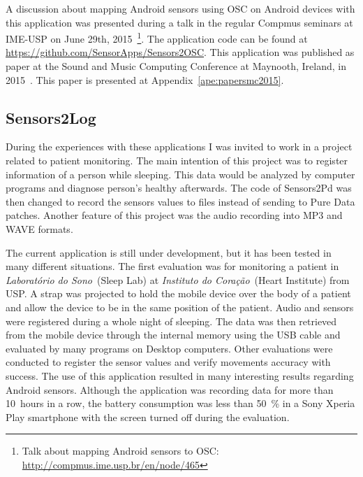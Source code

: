 A discussion about mapping Android sensors using OSC on Android devices with this application was presented during a talk in the regular Compmus seminars at IME-USP on June 29th, 2015~\footnote{Talk about mapping Android sensors to OSC: \url{http://compmus.ime.usp.br/en/node/465}}.
The application code can be found at \url{https://github.com/SensorApps/Sensors2OSC}.
This application was published as paper at the Sound and Music Computing Conference at Maynooth, Ireland, in 2015~\citep{deCarvalhoJunior2015sensors2osc}.
This paper is presented at Appendix~\ref{ape:papersmc2015}.

\subsection*{Sensors2Log}
\label{subsec:appsensors2log}

During the experiences with these applications I was invited to work in a project related to patient monitoring. %
The main intention of this project was to register information of a person while sleeping.
This data would be analyzed by computer programs and diagnose person's healthy afterwards.
The code of Sensors2Pd was then changed to record the sensors values to files instead of sending to Pure Data patches.
Another feature of this project was the audio recording into MP3 and WAVE formats.

The current application is still under development, but it has been tested in many different situations.
The first evaluation was for monitoring a patient in \textit{Laboratório do Sono}~(Sleep Lab) at \textit{Instituto do Coração}~(Heart Institute) from USP.
A strap was projected to hold the mobile device over the body of a patient and allow the device to be in the same position of the patient.
Audio and sensors were registered during a whole night of sleeping.
The data was then retrieved from the mobile device through the internal memory using the USB cable and evaluated by many programs on Desktop computers.
Other evaluations were conducted to register the sensor values and verify movements accuracy with success.
The use of this application resulted in many interesting results regarding Android sensors.
Although the application was recording data for more than 10~hours in a row, the battery consumption was less than 50~\% in a Sony Xperia Play smartphone with the screen turned off during the evaluation.

